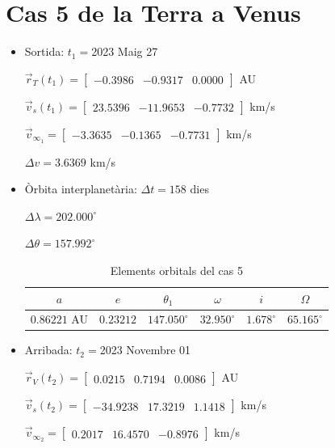 \section{Cas 5 de la Terra a Venus}
\begin{itemize}
	\item Sortida: $t_{1}=$2023 Maig 27

$\vec{r}_{T}(t_{1})=\begin{bmatrix}-0.3986 & -0.9317 & 0.0000\end{bmatrix}$ AU

$\vec{v}_{s}(t_{1})=\begin{bmatrix}23.5396 & -11.9653 & -0.7732\end{bmatrix}$ km/s

$\vec{v}_{\infty_{1}}= \begin{bmatrix}-3.3635 & -0.1365 & -0.7731\end{bmatrix}$ km/s

$\Delta v=3.6369$ km/s

	\item Òrbita interplanetària: $\Delta t=158$ dies

$\Delta\lambda=202.000^{\circ}$

$\Delta\theta=157.992^{\circ}$
\begin{table}[h!]
	\centering
	\begin{tabular}{ |c|c|c|c|c|c|}
		\hline
		$a$ & $e$ & $\theta_{1}$ & $\omega$ & $i$ & $\Omega$ \\ \hline
		$0.86221$ AU  & $0.23212$ & $147.050^{\circ}$ & $32.950^{\circ}$ & $1.678^{\circ}$ & $65.165^{\circ}$ \\ \hline
	\end{tabular}
	\caption{Elements orbitals del cas 5}
\end{table}

	\item Arribada: $t_{2}=$2023 Novembre 01

$\vec{r}_{V}(t_{2})=\begin{bmatrix}0.0215 & 0.7194 & 0.0086\end{bmatrix}$ AU

$\vec{v}_{s}(t_{2})=\begin{bmatrix}-34.9238 & 17.3219 & 1.1418\end{bmatrix}$ km/s


$\vec{v}_{\infty_{2}}=\begin{bmatrix}0.2017 & 16.4570 & -0.8976\end{bmatrix}$ km/s
\end{itemize}
